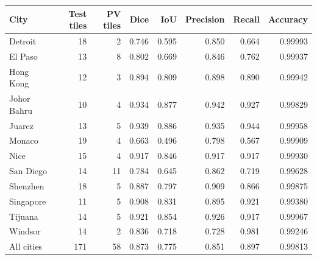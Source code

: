 {\scriptsize
\setlength{\tabcolsep}{3pt}
\renewcommand{\arraystretch}{0.95}
\begin{tabular}{@{}lrrrrrrr@{}}
\toprule
City & Test tiles & PV tiles & Dice & IoU & Precision & Recall & Accuracy \\
\midrule
Detroit & 18 & 2 & 0.746 & 0.595 & 0.850 & 0.664 & 0.99993 \\
El Paso & 13 & 8 & 0.802 & 0.669 & 0.846 & 0.762 & 0.99937 \\
Hong Kong & 12 & 3 & 0.894 & 0.809 & 0.898 & 0.890 & 0.99942 \\
Johor Bahru & 10 & 4 & 0.934 & 0.877 & 0.942 & 0.927 & 0.99829 \\
Juarez & 13 & 5 & 0.939 & 0.886 & 0.935 & 0.944 & 0.99958 \\
Monaco & 19 & 4 & 0.663 & 0.496 & 0.798 & 0.567 & 0.99909 \\
Nice & 15 & 4 & 0.917 & 0.846 & 0.917 & 0.917 & 0.99930 \\
San Diego & 14 & 11 & 0.784 & 0.645 & 0.862 & 0.719 & 0.99628 \\
Shenzhen & 18 & 5 & 0.887 & 0.797 & 0.909 & 0.866 & 0.99875 \\
Singapore & 11 & 5 & 0.908 & 0.831 & 0.895 & 0.921 & 0.99380 \\
Tijuana & 14 & 5 & 0.921 & 0.854 & 0.926 & 0.917 & 0.99967 \\
Windsor & 14 & 2 & 0.836 & 0.718 & 0.728 & 0.981 & 0.99246 \\
\midrule
All cities & 171 & 58 & 0.873 & 0.775 & 0.851 & 0.897 & 0.99813 \\
\bottomrule
\end{tabular}
}
